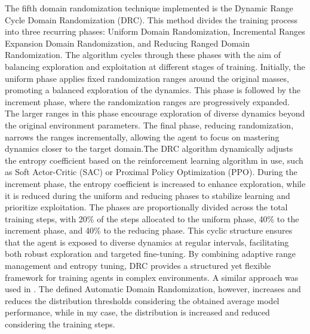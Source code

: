\documentclass[12pt]{article}
\begin{document}
The fifth domain randomization technique implemented is the Dynamic Range Cycle Domain Randomization (DRC). This method divides the training process into three recurring phases: Uniform Domain Randomization, Incremental Ranges Expansion Domain Randomization, and Reducing Ranged Domain Randomization. The algorithm cycles through these phases with the aim of balancing exploration and exploitation at different stages of training. Initially, the uniform phase applies fixed randomization ranges around the original masses, promoting a balanced exploration of the dynamics. This phase is followed by the increment phase, where the randomization ranges are progressively expanded. The larger ranges in this phase encourage exploration of diverse dynamics beyond the original environment parameters. The final phase, reducing randomization, narrows the ranges incrementally, allowing the agent to focus on mastering dynamics closer to the target domain.The DRC algorithm dynamically adjusts the entropy coefficient based on the reinforcement learning algorithm in use, such as Soft Actor-Critic (SAC) or Proximal Policy Optimization (PPO). During the increment phase, the entropy coefficient is increased to enhance exploration, while it is reduced during the uniform and reducing phases to stabilize learning and prioritize exploitation. The phases are proportionally divided across the total training steps, with 20\% of the steps allocated to the uniform phase, 40\% to the increment phase, and 40\% to the reducing phase. This cyclic structure ensures that the agent is exposed to diverse dynamics at regular intervals, facilitating both robust exploration and targeted fine-tuning. By combining adaptive range management and entropy tuning, DRC provides a structured yet flexible framework for training agents in complex environments. A similar approach was used in \cite{Akkaya2020}. The defined Automatic Domain Randomization, however, increases and reduces the distribution thresholds considering the obtained average model performance, while in my case, the distribution is increased and reduced considering the training steps.
\end{document}
